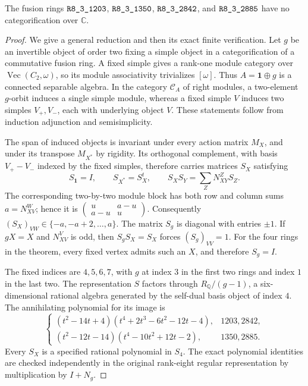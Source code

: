 \begin{theorem}
The fusion rings $\sha{R8_3_1203}$, $\sha{R8_3_1350}$, $\sha{R8_3_2842}$, and
$\sha{R8_3_2885}$ have no categorification over $\mathbb C$.
\end{theorem}
\begin{proof}
We give a general reduction and then its exact finite verification.
Let $g$ be an invertible object of order two fixing a simple object in a
categorification of a commutative fusion ring.  A fixed simple gives a
rank-one module category over $\operatorname{Vec}(C_2,\omega)$, so its
module associativity trivializes $[\omega]$.  Thus $A=\mathbf1\oplus g$
is a connected separable algebra.  In the category $\mathcal C_A$ of
right modules, a two-element $g$-orbit induces a single simple module,
whereas a fixed simple $V$ induces two simples $V_+,V_-$, each with
underlying object $V$.  These statements follow from induction
adjunction and semisimplicity.

The span of induced objects is invariant under every action matrix
$M_X$, and under its transpose $M_{X^*}$ by rigidity.  Its orthogonal
complement, with basis $V_+-V_-$ indexed by the fixed simples, therefore
carries matrices $S_X$ satisfying
\[
 S_{\mathbf1}=I,\qquad S_{X^*}=S_X^t,\qquad
 S_XS_Y=\sum_Z N_{XY}^Z S_Z.
\]
The corresponding two-by-two module block has both row and column sums
$a=N_{XV}^W$; hence it is
$\left(\begin{smallmatrix}u&a-u\\a-u&u\end{smallmatrix}\right)$.
Consequently $(S_X)_{VW}\in\{-a,-a+2,\ldots,a\}$.
The matrix $S_g$ is diagonal with entries $\pm1$.
If $gX=X$ and $N_{XV}^V$ is odd, then
$S_gS_X=S_X$ forces $(S_g)_{VV}=1$.  For the four rings in the theorem,
every fixed vertex admits such an $X$, and therefore $S_g=I$.

The fixed indices are $4,5,6,7$, with $g$ at index $3$ in the first two
rings and index $1$ in the last two.  The representation $S$ factors
through $R_{\mathbb Q}/(g-1)$, a six-dimensional rational algebra
generated by the self-dual basis object of index $4$.  The annihilating
polynomial for its image is
\[
\begin{cases}
(t^2-14t+4)(t^4+2t^3-6t^2-12t-4),&1203,2842,\\
(t^2-12t-14)(t^4-10t^2+12t-2),&1350,2885.
\end{cases}
\]
Every $S_X$ is a specified rational polynomial in $S_4$.  The exact
polynomial identities are checked independently in the original
rank-eight regular representation by multiplication by $I+N_g$.


\end{proof}
